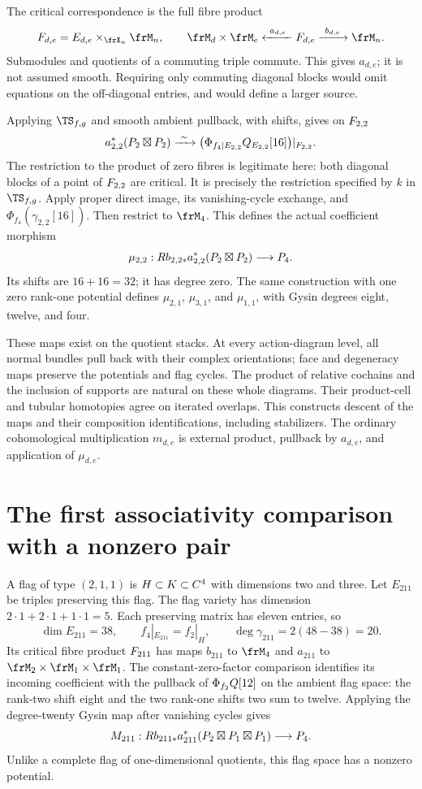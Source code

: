 The critical correspondence is the full fibre product
\[
 \cF_{d,e}=\cE_{d,e}\times_{\frX_n}\frM_n,
 \qquad
 \frM_d\times\frM_e\xleftarrow{\ a_{d,e}\ }\cF_{d,e}
                  \xrightarrow{\ b_{d,e}\ }\frM_n.
\]
Submodules and quotients of a commuting triple commute. This gives
$a_{d,e}$; it is not assumed smooth. Requiring only commuting
diagonal blocks would omit equations on the off-diagonal entries,
and would define a larger source.

Applying $\TS_{f,g}$ and smooth ambient pullback, with shifts,
gives on $F_{2,2}$
\[
 a_{2,2}^*(P_2\boxtimes P_2)
 \xrightarrow{\ \sim\ }
 \bigl(\Phi_{f_4|E_{2,2}}Q_{E_{2,2}}[16]\bigr)|_{F_{2,2}}.
\]
The restriction to the product of zero fibres is legitimate here:
both diagonal blocks of a point of $F_{2,2}$ are critical.
It is precisely the restriction specified by $k$ in $\TS_{f,g}$.
Apply proper direct image, its vanishing-cycle exchange, and
$\Phi_{f_4}(\gamma_{2,2}[16])$. Then restrict to $\frM_4$.
This defines the actual coefficient morphism
\[
 \mu_{2,2}:Rb_{2,2*}a_{2,2}^*(P_2\boxtimes P_2)
                         \longrightarrow P_4.
\]
Its shifts are $16+16=32$; it has degree zero. The same construction
with one zero rank-one potential defines $\mu_{2,1}$, $\mu_{3,1}$,
and $\mu_{1,1}$, with Gysin degrees eight, twelve, and four.

These maps exist on the quotient stacks. At every action-diagram
level, all normal bundles pull back with their complex orientations;
face and degeneracy maps preserve the potentials and flag cycles.
The product of relative cochains and the inclusion of supports are
natural on these whole diagrams. Their product-cell and tubular
homotopies agree on iterated overlaps. This constructs descent of
the maps and their composition identifications, including stabilizers.
The ordinary cohomological multiplication $m_{d,e}$ is external
product, pullback by $a_{d,e}$, and application of $\mu_{d,e}$.

\section{The first associativity comparison with a nonzero pair}
\label{ts22:sec:assoc}

A flag of type $(2,1,1)$ is $H\subset K\subset C^4$ with dimensions
two and three. Let $E_{211}$ be triples preserving this flag.
The flag variety has dimension $2\cdot1+2\cdot1+1\cdot1=5$.
Each preserving matrix has eleven entries, so
\[
 \dim E_{211}=38,\qquad f_4|_{E_{211}}=f_2|_H,
 \qquad \deg\gamma_{211}=2(48-38)=20.
\]
Its critical fibre product $F_{211}$ has maps $b_{211}$ to
$\frM_4$ and $a_{211}$ to $\frM_2\times\frM_1\times\frM_1$.
The constant-zero-factor comparison identifies its incoming
coefficient with the pullback of $\Phi_{f_2}Q[12]$ on the ambient
flag space: the rank-two shift eight and the two rank-one shifts
two sum to twelve. Applying the degree-twenty Gysin map after
vanishing cycles gives
\[
 M_{211}:Rb_{211*}a_{211}^*(P_2\boxtimes P_1\boxtimes P_1)
                  \longrightarrow P_4.
\]
Unlike a complete flag of one-dimensional quotients, this flag
space has a nonzero potential.

